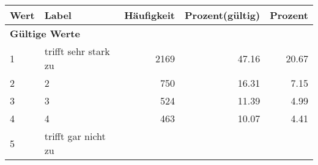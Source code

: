      \begin{longtable}{lXrrr}
     \toprule
     \textbf{Wert} & \textbf{Label} & \textbf{Häufigkeit} & \textbf{Prozent(gültig)} & \textbf{Prozent} \\
     \endhead
     \midrule
     \multicolumn{5}{l}{\textbf{Gültige Werte}}\\

     1 &
     \multicolumn{1}{X}{ trifft sehr stark zu   } &


       \num{2169} &
       \num[round-mode=places,round-precision=2]{47.16} &
         \num[round-mode=places,round-precision=2]{20.67} \\

     2 &
     \multicolumn{1}{X}{ 2   } &


       \num{750} &
       \num[round-mode=places,round-precision=2]{16.31} &
         \num[round-mode=places,round-precision=2]{7.15} \\

     3 &
     \multicolumn{1}{X}{ 3   } &


       \num{524} &
       \num[round-mode=places,round-precision=2]{11.39} &
         \num[round-mode=places,round-precision=2]{4.99} \\

     4 &
     \multicolumn{1}{X}{ 4   } &


       \num{463} &
       \num[round-mode=places,round-precision=2]{10.07} &
         \num[round-mode=places,round-precision=2]{4.41} \\

     5 &
     \multicolumn{1}{X}{ trifft gar nicht zu   } &



\end{longtable}
